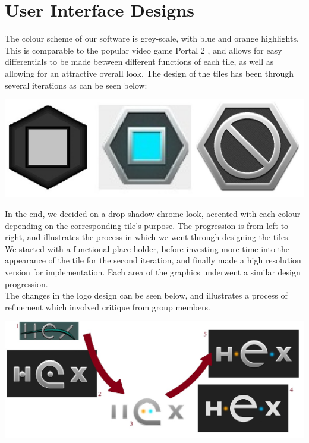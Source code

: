 \documentclass[10pt,a4paper]{article}
\begin{document}
\pagebreak
\section{User Interface Designs}
The colour scheme of our software is grey-scale, with blue and orange highlights. This is comparable to the popular video game Portal 2 \cite{portal2}, and allows for easy differentials to be made between different functions of each tile, as well as allowing for an attractive overall look. The design of the tiles has been through several iterations as can be seen below:\\
\begin{center}
\includegraphics[scale=0.3]{tileprogression.jpg}
\end{center}

In the end, we decided on a drop shadow chrome look, accented with each colour depending on the corresponding tile's purpose. The progression is from left to right, and illustrates the process in which we went through designing the tiles. We started with a functional place holder, before investing more time into the appearance of the tile for the second iteration, and finally made a high resolution version for implementation. Each area of the graphics underwent a similar design progression.
\\
The changes in the logo design can be seen below, and illustrates a process of refinement which involved critique from group members.
\begin{center}
\includegraphics[scale=0.5]{logoprogression.jpg}
\end{center}
\end{document}
